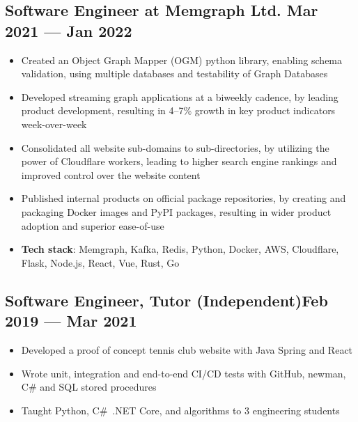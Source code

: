 \documentclass{article}
\begin{document}
\subsection{Software Engineer at Memgraph Ltd. \hfill Mar 2021 --- Jan 2022}
\begin{itemize}
  \itemsep0em
  \item Created an Object Graph Mapper (OGM) python library, enabling schema validation, using multiple databases and testability of Graph Databases
  \item Developed streaming graph applications at a biweekly cadence, by leading product development, resulting in 4--7\% growth in key product indicators week-over-week
  \item Consolidated all website sub-domains to sub-directories, by utilizing the power of Cloudflare workers, leading to higher search engine rankings and improved control over the website content
  \item Published internal products on official package repositories, by creating and packaging Docker images and PyPI packages, resulting in wider product adoption and superior ease-of-use
  \item {\bfseries Tech stack}: Memgraph, Kafka, Redis, Python, Docker, AWS, Cloudflare, Flask, Node.js, React, Vue, Rust, Go
\end{itemize}

\subsection{Software Engineer, Tutor (Independent)\hfill Feb 2019 --- Mar 2021}
\begin{itemize}
  \itemsep0em
  \item Developed a proof of concept tennis club website with Java Spring and React
  \item Wrote unit, integration and end-to-end CI/CD tests with GitHub, newman, C\# and SQL stored procedures
  \item Taught Python, C\#~.NET Core, and algorithms to 3 engineering students
\end{itemize}
\end{document}
